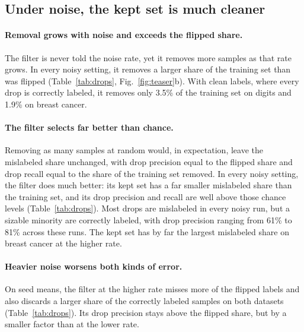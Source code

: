 \subsection{Under noise, the kept set is much cleaner}\label{sec:results_drops}



\paragraph{Removal grows with noise and exceeds the flipped share.}
The filter is never told the noise rate, yet it removes more samples as that rate grows. In every noisy setting, it removes a larger share of the training set than was flipped (Table~\ref{tab:drops}, Fig.~\ref{fig:teaser}b). With clean labels, where every drop is correctly labeled, it removes only 3.5\% of the training set on digits and 1.9\% on breast cancer.

\paragraph{The filter selects far better than chance.}
Removing as many samples at random would, in expectation, leave the mislabeled share unchanged, with drop precision equal to the flipped share and drop recall equal to the share of the training set removed. In every noisy setting, the filter does much better: its kept set has a far smaller mislabeled share than the training set, and its drop precision and recall are well above those chance levels (Table~\ref{tab:drops}). Most drops are mislabeled in every noisy run, but a sizable minority are correctly labeled, with drop precision ranging from 61\% to 81\% across these runs. The kept set has by far the largest mislabeled share on breast cancer at the higher rate.

\paragraph{Heavier noise worsens both kinds of error.}
On seed means, the filter at the higher rate misses more of the flipped labels and also discards a larger share of the correctly labeled samples on both datasets (Table~\ref{tab:drops}). Its drop precision stays above the flipped share, but by a smaller factor than at the lower rate.
